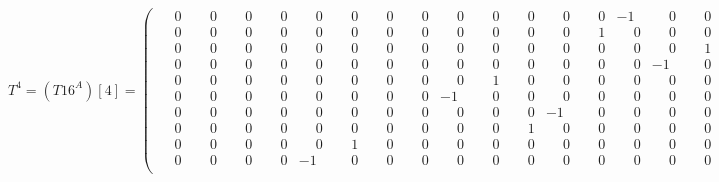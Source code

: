 \documentclass[10pt]{article}
\begin{document}
\[
T^{4} = (T16^A)[4] = \left(\begin{smallmatrix}
\phantom{-}0 & \phantom{-}0 & \phantom{-}0 & \phantom{-}0 & \phantom{-}0 & \phantom{-}0 & \phantom{-}0 & \phantom{-}0 & \phantom{-}0 & \phantom{-}0 & \phantom{-}0 & \phantom{-}0 & \phantom{-}0 & -1 & \phantom{-}0 & \phantom{-}0 \\
\phantom{-}0 & \phantom{-}0 & \phantom{-}0 & \phantom{-}0 & \phantom{-}0 & \phantom{-}0 & \phantom{-}0 & \phantom{-}0 & \phantom{-}0 & \phantom{-}0 & \phantom{-}0 & \phantom{-}0 & \phantom{-}1 & \phantom{-}0 & \phantom{-}0 & \phantom{-}0 \\
\phantom{-}0 & \phantom{-}0 & \phantom{-}0 & \phantom{-}0 & \phantom{-}0 & \phantom{-}0 & \phantom{-}0 & \phantom{-}0 & \phantom{-}0 & \phantom{-}0 & \phantom{-}0 & \phantom{-}0 & \phantom{-}0 & \phantom{-}0 & \phantom{-}0 & \phantom{-}1 \\
\phantom{-}0 & \phantom{-}0 & \phantom{-}0 & \phantom{-}0 & \phantom{-}0 & \phantom{-}0 & \phantom{-}0 & \phantom{-}0 & \phantom{-}0 & \phantom{-}0 & \phantom{-}0 & \phantom{-}0 & \phantom{-}0 & \phantom{-}0 & -1 & \phantom{-}0 \\
\phantom{-}0 & \phantom{-}0 & \phantom{-}0 & \phantom{-}0 & \phantom{-}0 & \phantom{-}0 & \phantom{-}0 & \phantom{-}0 & \phantom{-}0 & \phantom{-}1 & \phantom{-}0 & \phantom{-}0 & \phantom{-}0 & \phantom{-}0 & \phantom{-}0 & \phantom{-}0 \\
\phantom{-}0 & \phantom{-}0 & \phantom{-}0 & \phantom{-}0 & \phantom{-}0 & \phantom{-}0 & \phantom{-}0 & \phantom{-}0 & -1 & \phantom{-}0 & \phantom{-}0 & \phantom{-}0 & \phantom{-}0 & \phantom{-}0 & \phantom{-}0 & \phantom{-}0 \\
\phantom{-}0 & \phantom{-}0 & \phantom{-}0 & \phantom{-}0 & \phantom{-}0 & \phantom{-}0 & \phantom{-}0 & \phantom{-}0 & \phantom{-}0 & \phantom{-}0 & \phantom{-}0 & -1 & \phantom{-}0 & \phantom{-}0 & \phantom{-}0 & \phantom{-}0 \\
\phantom{-}0 & \phantom{-}0 & \phantom{-}0 & \phantom{-}0 & \phantom{-}0 & \phantom{-}0 & \phantom{-}0 & \phantom{-}0 & \phantom{-}0 & \phantom{-}0 & \phantom{-}1 & \phantom{-}0 & \phantom{-}0 & \phantom{-}0 & \phantom{-}0 & \phantom{-}0 \\
\phantom{-}0 & \phantom{-}0 & \phantom{-}0 & \phantom{-}0 & \phantom{-}0 & \phantom{-}1 & \phantom{-}0 & \phantom{-}0 & \phantom{-}0 & \phantom{-}0 & \phantom{-}0 & \phantom{-}0 & \phantom{-}0 & \phantom{-}0 & \phantom{-}0 & \phantom{-}0 \\
\phantom{-}0 & \phantom{-}0 & \phantom{-}0 & \phantom{-}0 & -1 & \phantom{-}0 & \phantom{-}0 & \phantom{-}0 & \phantom{-}0 & \phantom{-}0 & \phantom{-}0 & \phantom{-}0 & \phantom{-}0 & \phantom{-}0 & \phantom{-}0 & \phantom{-}0 \\

\end{smallmatrix}\]
\end{document}
